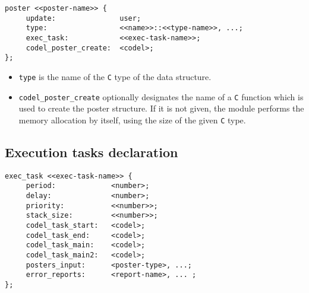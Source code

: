 \begin{center}\begin{cartouche}\small\begin{verbatim}
poster <<poster-name>> {
     update:               user;
     type:                 <<name>>::<<type-name>>, ...;
     exec_task:            <<exec-task-name>>; 
     codel_poster_create:  <codel>;
};
\end{verbatim}\end{cartouche}\end{center}

\begin{itemize}
\item {\tt type} is the name of the {\tt C} type of the data structure.
\item {\tt codel\_poster\_create} optionally designates the name of a {\tt C}
function which is   used to create the  poster  structure. If  it is  not
given,  the  module performs the memory  allocation  by itself, using the
size of the  given {\tt C} type.
\end{itemize}


\subsection{Execution tasks declaration}

\begin{center}\begin{cartouche}\small\begin{verbatim}
exec_task <<exec-task-name>> {
     period:             <number>;
     delay:              <number>;
     priority:           <<number>>;
     stack_size:         <<number>>;
     codel_task_start:   <codel>;
     codel_task_end:     <codel>;
     codel_task_main:    <codel>;
     codel_task_main2:   <codel>;
     posters_input:      <poster-type>, ...;
     error_reports:      <report-name>, ... ;
};
\end{verbatim}\end{cartouche}\end{center}

